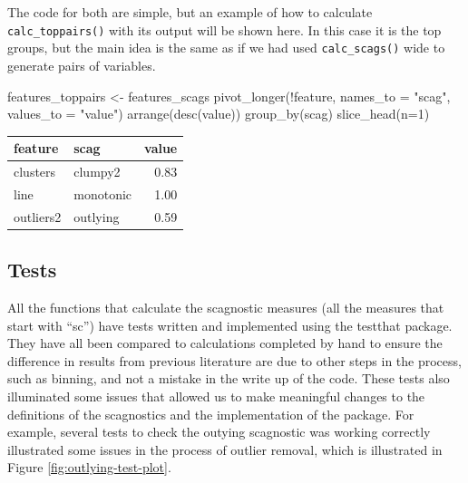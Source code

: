 The code for both are simple, but an example of how to calculate
\texttt{calc\_toppairs()} with its output will be shown here. In this
case it is the top groups, but the main idea is the same as if we had
used \texttt{calc\_scags()} wide to generate pairs of variables.

\begin{Schunk}
\begin{Sinput}
features_toppairs <- features_scags %
  pivot_longer(!feature, names_to = "scag", values_to = "value") %
  arrange(desc(value)) %
  group_by(scag) %
  slice_head(n=1)
\end{Sinput}
\end{Schunk}

\begin{Schunk}

\begin{tabular}{l|l|r}
\hline
feature & scag & value\\
\hline
clusters & clumpy2 & 0.83\\
\hline
line & monotonic & 1.00\\
\hline
outliers2 & outlying & 0.59\\
\hline
\end{tabular}

\end{Schunk}

\hypertarget{tests}{%
\subsection{Tests}\label{tests}}

All the functions that calculate the scagnostic measures (all the
measures that start with ``sc'') have tests written and implemented
using the testthat package. They have all been compared to calculations
completed by hand to ensure the difference in results from previous
literature are due to other steps in the process, such as binning, and
not a mistake in the write up of the code. These tests also illuminated
some issues that allowed us to make meaningful changes to the
definitions of the scagnostics and the implementation of the package.
For example, several tests to check the outying scagnostic was working
correctly illustrated some issues in the process of outlier removal,
which is illustrated in Figure \ref{fig:outlying-test-plot}.


